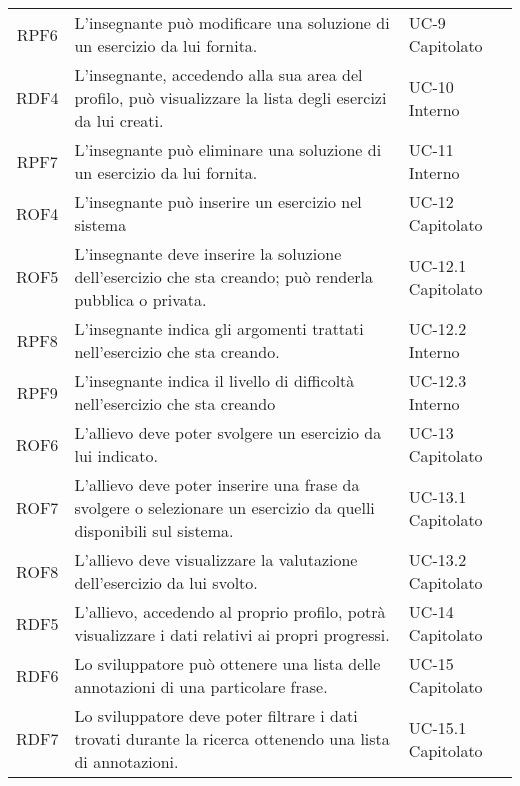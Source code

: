 \begin{tabularx}{\textwidth}{| c | p{10cm} | X |}
		RPF6 & L'insegnante può modificare una soluzione di un esercizio da lui fornita. & UC-9 \newline Capitolato\\
		RDF4 & L'insegnante, accedendo alla sua area del profilo, può visualizzare la lista degli esercizi da lui creati. & UC-10 \newline Interno\\
		RPF7 & L'insegnante può eliminare una soluzione di un esercizio da lui fornita. & UC-11 \newline Interno\\
		ROF4 & L'insegnante può inserire un esercizio nel sistema & UC-12 \newline Capitolato\\
		ROF5 & L'insegnante deve inserire la soluzione dell'esercizio che sta creando; può renderla pubblica o privata. & UC-12.1 \newline Capitolato\\
		RPF8 & L'insegnante indica gli argomenti trattati nell'esercizio che sta creando. & UC-12.2 \newline Interno\\
		 RPF9 & L'insegnante indica il livello di difficoltà nell'esercizio che sta creando & UC-12.3 \newline Interno\\
		ROF6 & L'allievo deve poter svolgere un esercizio da lui indicato. & UC-13 \newline Capitolato\\
		ROF7 & L'allievo deve poter inserire una frase da svolgere o selezionare un esercizio da quelli disponibili sul sistema. & UC-13.1 \newline Capitolato\\
		ROF8 & L'allievo deve visualizzare la valutazione dell'esercizio da lui svolto. & UC-13.2 \newline Capitolato\\
		RDF5 & L'allievo, accedendo al proprio profilo, potrà visualizzare i dati relativi ai propri progressi. & UC-14 \newline Capitolato\\
		RDF6 & Lo sviluppatore può ottenere una lista delle annotazioni di una particolare frase. & UC-15 \newline Capitolato\\
		RDF7 & Lo sviluppatore deve poter filtrare i dati trovati durante la ricerca ottenendo una lista di annotazioni. & UC-15.1 \newline Capitolato\\

\end{tabularx}
